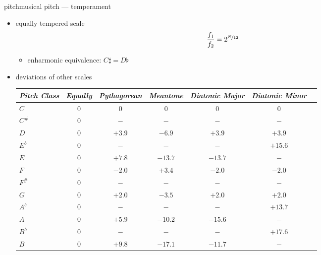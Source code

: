        
        \begin{frame}{pitch}{musical pitch --- temperament}
            \begin{itemize}
                \item	equally tempered scale
                    \begin{equation*}
                        \frac{f_1}{f_2} = 2^{\nicefrac{N}{12}} 
                    \end{equation*}
                    \begin{itemize}
                        \item<2->	enharmonic equivalence: $C\sharp = D\flat$
                    \end{itemize}

                \item<3->	deviations of other scales
                    \begin{tiny}\begin{table}
                        \centering
                        \begin{tabular}{lcccccc} %
                            \\ \hline
                            \bf{\emph{Pitch Class}}	 & \bf{\emph{Equally}}	 & \bf{\emph{Pythagorean}}	 & \bf{\emph{Meantone}}	 & \bf{\emph{Diatonic Major}}	 & \bf{\emph{Diatonic Minor}}\\ 
                             \hline
                            \bf{$C$}	 & $0$	 & $0$	 & $0$	 & $0$	 & $0$\\
                            \bf{$C^\#$}	 & $0$	 & $-$	 & $-$	 & $-$	 & $-$\\
                            \bf{$D$}	 & $0$	 & $+3.9$	 & $-6.9$	 & $+3.9$	 & $+3.9$\\
                            \bf{$E^b$}	 & $0$	 & $-$	 & $-$	 & $-$	 & $+15.6$\\
                            \bf{$E$}	 & $0$	 & $+7.8$	 & $-13.7$	 & $-13.7$	 & $-$\\
                            \bf{$F$}	 & $0$	 & $-2.0$	 & $+3.4$	 & $-2.0$	 & $-2.0$\\
                            \bf{$F^\#$}	 & $0$	 & $-$	 & $-$	 & $-$	 & $-$\\
                            \bf{$G$}	 & $0$	 & $+2.0$	 & $-3.5$	 & $+2.0$	 & $+2.0$\\
                            \bf{$A^b$}	 & $0$	 & $-$	 & $-$	 & $-$	 & $+13.7$\\
                            \bf{$A$}	 & $0$	 & $+5.9$	 & $-10.2$	 & $-15.6$	 & $-$\\
                            \bf{$B^b$}	 & $0$	 & $-$	 & $-$ 	 & $-$	 & $+17.6$\\
                            \bf{$B$}	 & $0$	 & $+9.8$	 & $-17.1$	 & $-11.7$	 & $-$\\
                        \end{tabular}
                    \end{table}\end{tiny}			
            \end{itemize}
        \end{frame}
        
